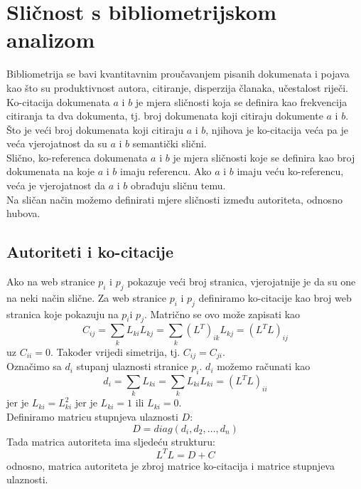 \documentclass[11pt]{article}
\begin{document}
\section{Sličnost s bibliometrijskom analizom}
Bibliometrija se bavi kvantitavnim proučavanjem pisanih dokumenata i pojava kao što su produktivnost autora, citiranje, disperzija članaka, učestalost riječi. \\
Ko-citacija dokumenata $a$ i $b$ je mjera sličnosti koja se definira kao frekvencija citiranja ta dva dokumenta, tj. broj dokumenata koji citiraju dokumente $a$ i $b$. Što je veći broj dokumenata koji citiraju $a$ i $b$, njihova je ko-citacija veća pa je veća vjerojatnost da su $a$ i $b$ semantički slični.\\
Slično, ko-referenca dokumenata $a$ i $b$ je mjera sličnosti koje se definira kao broj dokumenata na koje $a$ i $b$ imaju referencu. Ako $a$ i $b$ imaju veću ko-referencu, veća je vjerojatnost da $a$ i $b$ obrađuju sličnu temu.\\
Na sličan način možemo definirati mjere sličnosti između autoriteta, odnosno hubova.
\subsection{Autoriteti i ko-citacije}
Ako na web stranice $p_i$ i $p_j$ pokazuje veći broj stranica, vjerojatnije je da su one na neki način slične.
Za web stranice $p_i$ i $p_j$ definiramo ko-citacije kao broj web stranica koje pokazuju na $p_i$i $p_j$. Matrično se ovo može zapisati kao
\begin{equation}
C_{ij} = \sum_{k} L_{ki}L_{kj} = \sum_{k}(L^{T})_{ik}L_{kj} = (L^{T}L)_{ij}
\end{equation}
uz $C_{ii} = 0$. Također vrijedi simetrija, tj. $C_{ij} = C_{ji}$.\\
Označimo sa $d_{i}$ stupanj ulaznosti stranice $p_{i}$. $d_{i}$ možemo računati kao
\begin{equation}
d_{i} = \sum_{k}L_{ki} = \sum_{k}L_{ki}L_{ki} = (L^{T}L)_{ii}
\end{equation}
jer je $L_{ki} = L_{ki}^2$ jer je $L_{ki} =1$ ili  $L_{ki} = 0$.\\
Definiramo matricu stupnjeva ulaznosti $D$:
\begin{equation}
D = diag(d_{i},d_{2}, \dots , d_{n})
\end{equation}
Tada matrica autoriteta ima sljedeću strukturu:
\begin{equation}
L^{T}L = D + C
\end{equation}
odnosno, matrica autoriteta je zbroj matrice ko-citacija i matrice stupnjeva ulaznosti.
\end{document}
